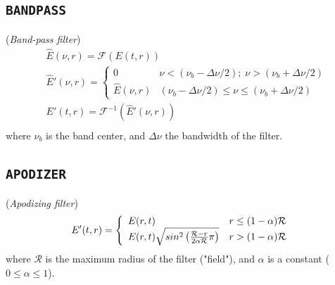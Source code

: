 \documentclass{report}
\begin{document}
\subsection*{\texttt{BANDPASS}}
(\textit{Band-pass filter})
\begin{equation}
\begin{aligned}
&\widehat{E}(\nu,r) = \mathcal{F}(E(t,r))\\
&\widehat{E}'(\nu,r) = \left\{
	\begin{array}{ll}
  		0                  & \nu<(\nu_b-\Delta\nu/2); \; \nu>(\nu_b+\Delta\nu/2)\\
  		\widehat{E}(\nu,r) & (\nu_b-\Delta\nu/2) \leq \nu \leq (\nu_b+\Delta\nu/2)
  \end{array}
\right.\\ 
&E'(t,r) = \mathcal{F}^{-1}(\widehat{E}'(\nu,r))\\
\end{aligned}
\end{equation}
where $\nu_b$ is the band center, and $\Delta\nu$ the bandwidth of the filter.

\subsection*{\texttt{APODIZER}}
(\textit{Apodizing filter})
\begin{equation}
E'(t,r) = \left\{
	\begin{array}{ll}
  		E(r,t)             & r\leq(1-\alpha)\mathcal{R}\\
  		E(r,t)\sqrt{sin^2\left(\frac{\mathcal{R}-r}{2\alpha\mathcal{R}}\pi\right)} & r>(1-\alpha)\mathcal{R}
  	\end{array}
\right.\\ 
\end{equation}
where $\mathcal{R}$ is the maximum radius of the filter ("field"), and $\alpha$ is a constant (${0\leq\alpha\leq1}$).
\end{document}
